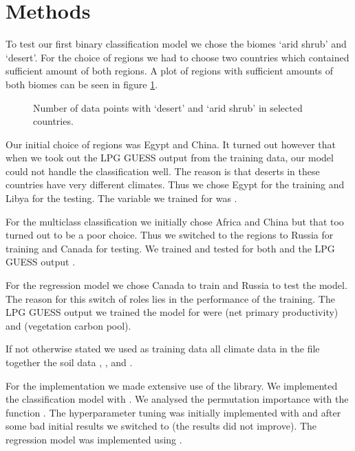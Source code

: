 
\section{Methods}

To test our first binary classification model we chose the biomes `arid shrub' and `desert'. For the choice of regions
we had to choose two countries which contained sufficient amount of both regions. A plot of regions with sufficient amounts
of both biomes can be seen in figure \ref{}.
\begin{figure}
  \centering
  \begin{minipage}{0.45\textwidth}
    \centering
    \missingfigure[figwidth=\textwidth]{}
    \caption{Number of data points with `desert' and `arid shrub' in selected countries.}
    \label{pl:}
  \end{minipage}
\end{figure}
Our initial choice of regions was Egypt and China.
It turned out however that when we took out the LPG GUESS output from the training data, our model could not handle the classification well.
The reason is that deserts in these countries have very different climates. Thus we chose Egypt for the training and Libya for the testing.
The variable we trained for was .

For the multiclass classification we initially chose Africa and China but that too turned out to be a poor choice.
Thus we switched to the regions to Russia for training and Canada for testing. We trained and tested for both
 and the LPG GUESS output .

For the regression model we chose Canada to train and Russia to test the model. The reason for this switch of roles lies in the performance
of the training. The LPG GUESS output we trained the model for were  (net primary productivity) and  (vegetation carbon pool).

If not otherwise stated we used as training data all climate data in the file  together the soil data , ,  and .

For the implementation we made extensive use of the  library. We implemented the classification model with .
We analysed the permutation importance with the function .
The hyperparameter tuning was initially implemented with  and after some bad initial results we switched to 
(the results did not improve).
The regression model was implemented using .

